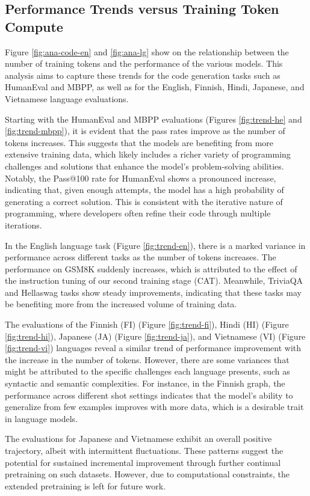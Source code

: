 \subsection{Performance Trends versus Training Token Compute}
\label{ap:ana}
Figure \ref{fig:ana-code-en} and \ref{fig:ana-lg} show on the relationship between the number of training tokens and the performance of the various models. This analysis aims to capture these trends for the code generation tasks such as HumanEval and MBPP, as well as for the English, Finnish, Hindi, Japanese, and Vietnamese language evaluations.

Starting with the HumanEval and MBPP evaluations (Figures \ref{fig:trend-he} and \ref{fig:trend-mbpp}), it is evident that the pass rates improve as the number of tokens increases. This suggests that the models are benefiting from more extensive training data, which likely includes a richer variety of programming challenges and solutions that enhance the model's problem-solving abilities. Notably, the Pass@100 rate for HumanEval shows a pronounced increase, indicating that, given enough attempts, the model has a high probability of generating a correct solution. This is consistent with the iterative nature of programming, where developers often refine their code through multiple iterations.

In the English language task (Figure \ref{fig:trend-en}), there is a marked variance in performance across different tasks as the number of tokens increases. The performance on GSM8K suddenly increases, which is attributed to the effect of the instruction tuning of our second training stage (CAT). Meanwhile, TriviaQA and Hellaswag tasks show steady improvements, indicating that these tasks may be benefiting more from the increased volume of training data.


The evaluations of the Finnish (FI) (Figure \ref{fig:trend-fi}), Hindi (HI) (Figure \ref{fig:trend-hi}), Japanese (JA) (Figure \ref{fig:trend-ja}), and Vietnamese (VI) (Figure \ref{fig:trend-vi}) languages reveal a similar trend of performance improvement with the increase in the number of tokens. However, there are some variances that might be attributed to the specific challenges each language presents, such as syntactic and semantic complexities. For instance, in the Finnish graph, the performance across different shot settings indicates that the model's ability to generalize from few examples improves with more data, which is a desirable trait in language models.

The evaluations for Japanese and Vietnamese exhibit an overall positive trajectory, albeit with intermittent fluctuations. These patterns suggest the potential for sustained incremental improvement through further continual pretraining on such datasets. However, due to computational
constraints, the extended pretraining is left for future work.

